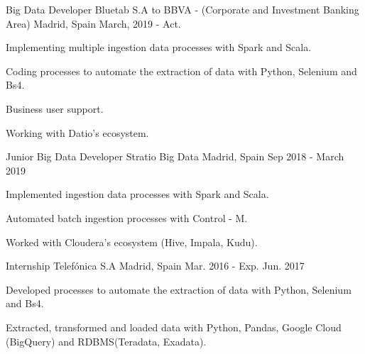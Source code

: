 

\begin{cventries}

  \cventry
    {Big Data Developer} %
    {Bluetab S.A to BBVA - (Corporate and Investment Banking Area)} %
    {Madrid, Spain} %
    {March, 2019 - Act.} %
    {
      \begin{cvitems} %
        \item {Implementing multiple ingestion data processes with Spark and Scala.}
        \item {Coding processes to automate the extraction of data with Python, Selenium and Bs4.}
        \item {Business user support.}
        \item {Working with Datio's ecosystem.}
      \end{cvitems}
    }

  \cventry
    {Junior Big Data Developer} %
    {Stratio Big Data} %
    {Madrid, Spain} %
    {Sep 2018 - March 2019} %
    {
      \begin{cvitems} %
        \item {Implemented ingestion data processes with Spark and Scala.}
        \item {Automated batch ingestion processes with Control - M.}
        \item {Worked with Cloudera's ecosystem (Hive, Impala, Kudu).}
      \end{cvitems}
    }

  \cventry
    {Internship} %
    {Telefónica S.A} %
    {Madrid, Spain} %
    {Mar. 2016 - Exp. Jun. 2017} %
    {
      \begin{cvitems} %
        \item {Developed processes to automate the extraction of data with Python, Selenium and Bs4.}
        \item {Extracted, transformed and loaded data with Python, Pandas, Google Cloud (BigQuery) and RDBMS(Teradata, Exadata).}
      \end{cvitems}
    }

\end{cventries}
